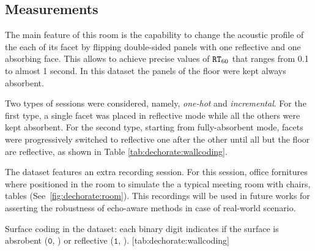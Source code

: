 \subsection{Measurements}
The main feature of this room is the capability to change the acoustic profile of the each of its facet by flipping double-sided panels with one reflective and one absorbing face.
This allows to achieve precise values of $\mathtt{RT}_{60}$ that ranges from 0.1 to almost 1 second.
In this dataset the panels of the floor were kept always absorbent.

\mynewline
Two types of sessions were considered, namely, \textit{one-hot} and \textit{incremental}.
For the first type, a single facet was placed in reflective mode while all the others were kept absorbent.
For the second type, starting from fully-absorbent mode, facets were progressively switched to reflective one after the other until all but the floor are reflective, as shown in Table \ref{tab:dechorate:wallcoding}.

\mynewline
The dataset features an extra recording session.
For this session, office fornitures where positioned in the room to simulate the a typical meeting room with chairs, tables (See~\cref{fig:dechorate:room}).
This recordings will be used in future works for asserting the robustness of echo-aware methods in case of real-world scenario.

\begin{table}[h]
    \begin{sidecaption}[]{
        Surface coding in the dataset: each binary digit indicates if the surface is absrobent ($\mathtt{0}$, \xmark ) or reflective ($\mathtt{1}$, \cmark).
        }[tab:dechorate:wallcoding]
        \centering
        \small
        
    \end{sidecaption}
\end{table}


